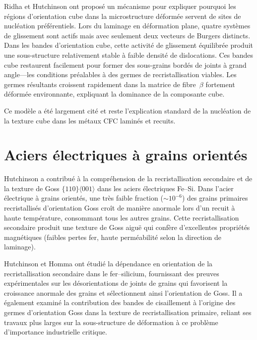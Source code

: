 \documentclass[11pt,a4paper]{article}
\begin{document}
Ridha et Hutchinson \cite{Ridha1982} ont propos\'e un m\'ecanisme pour
expliquer pourquoi les r\'egions d'orientation cube dans la
microstructure d\'eform\'ee servent de sites de nucl\'eation
pr\'ef\'erentiels.  Lors du laminage en d\'eformation plane, quatre
syst\`emes de glissement sont actifs mais avec seulement deux vecteurs
de Burgers distincts.  Dans les bandes d'orientation cube, cette
activit\'e de glissement \'equilibr\'ee produit une sous-structure
relativement stable \`a faible densit\'e de dislocations.  Ces bandes
cube restaurent facilement pour former des sous-grains bord\'es de
joints \`a grand angle---les conditions pr\'ealables \`a des germes de
recristallisation viables.  Les germes r\'esultants croissent rapidement
dans la matrice de fibre~$\beta$ fortement d\'eform\'ee environnante,
expliquant la dominance de la composante cube.

Ce mod\`ele a \'et\'e largement cit\'e et reste l'explication standard
de la nucl\'eation de la texture cube dans les m\'etaux CFC lamin\'es et
recuits.

\section{Aciers \'electriques \`a grains orient\'es}
\label{sec:goss}

Hutchinson a contribu\'e \`a la compr\'ehension de la recristallisation
secondaire et de la texture de Goss $\{110\}\langle 001\rangle$ dans
les aciers \'electriques Fe--Si.  Dans l'acier \'electrique \`a grains
orient\'es, une tr\`es faible fraction ($\sim\!10^{-6}$) des grains
primaires recristallis\'es d'orientation Goss cro\^it de mani\`ere
anormale lors d'un recuit \`a haute temp\'erature, consommant tous les
autres grains.  Cette \og recristallisation secondaire \fg{} produit une
texture de Goss aigu\"e qui conf\`ere d'excellentes propri\'et\'es
magn\'etiques (faibles pertes fer, haute perm\'eabilit\'e selon la
direction de laminage).

Hutchinson et Homma \cite{Homma2003} ont \'etudi\'e la d\'ependance
en orientation de la recristallisation secondaire dans le fer--silicium,
fournissant des preuves exp\'erimentales sur les d\'esorientations de
joints de grains qui favorisent la croissance anormale des grains et
s\'electionnent ainsi l'orientation de Goss.  Il a \'egalement examin\'e
la contribution des bandes de cisaillement \`a l'origine des germes
d'orientation Goss dans la texture de recristallisation primaire, reliant
ses travaux plus larges sur la sous-structure de d\'eformation \`a ce
probl\`eme d'importance industrielle critique.
\end{document}
